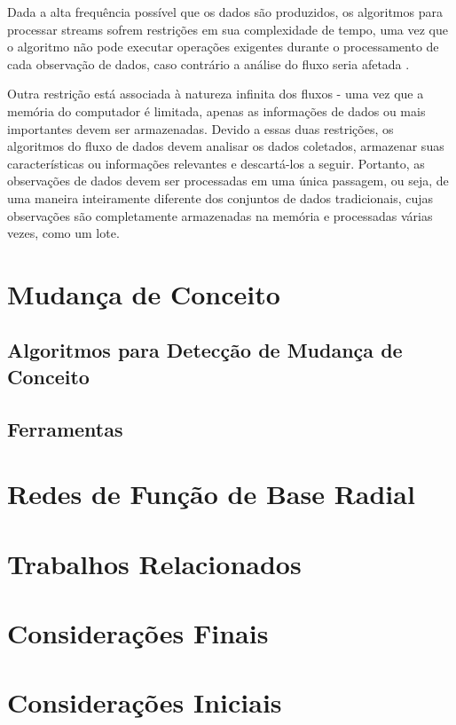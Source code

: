 \documentclass[qual, classic, a4paper]{ufbathesis}
\begin{document}
Dada a alta frequência possível que os dados são produzidos, os algoritmos para processar streams sofrem restrições em sua complexidade de tempo, uma vez que o algoritmo não pode executar operações exigentes durante o processamento de cada observação de dados, caso contrário a análise do fluxo seria afetada \cite{EDDM}.

Outra restrição está associada à natureza infinita dos fluxos - uma vez que a memória do computador é limitada, apenas as informações de dados ou mais importantes devem ser armazenadas. Devido a essas duas restrições, os algoritmos do fluxo de dados devem analisar os dados coletados, armazenar suas características ou informações relevantes e descartá-los a seguir. Portanto, as observações de dados devem ser processadas em uma única passagem, ou seja, de uma maneira inteiramente diferente dos conjuntos de dados tradicionais, cujas observações são completamente armazenadas na memória e processadas várias vezes, como um lote.

\section{Mudança de Conceito}
\blindtext

\subsection{Algoritmos para Detecção de Mudança de Conceito}
\blindtext

\subsection{Ferramentas}
\blindtext

\section{Redes de Função de Base Radial}
\blindtext
  
\section{Trabalhos Relacionados}
\blindtext

\section{Considerações Finais}
\blindtext

 \label{plano_pesquisa}
\section{Considerações Iniciais}
\blindtext
\end{document}
